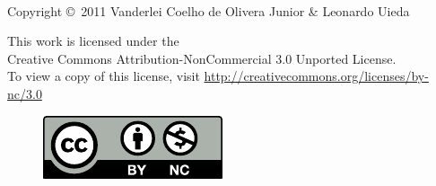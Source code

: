 \thispagestyle{empty}
\clearpage

\\[1cm]
\noindent Copyright \copyright\ 2011
Vanderlei Coelho de Olivera Junior \& Leonardo Uieda
\\[0.5cm]

\begin{center}
This work is licensed under the \\
Creative Commons Attribution-NonCommercial
3.0 Unported License.\\
To view a copy of this license, visit
\url{http://creativecommons.org/licenses/by-nc/3.0}
\end{center}

\begin{figure}[!h]
    \centering
    \includegraphics[scale=0.8]{figs/cc-by-nc}
\end{figure}
